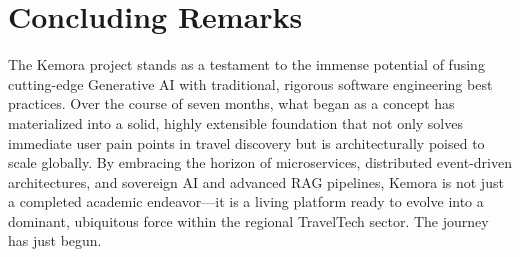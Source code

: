 \section{Concluding Remarks}
The Kemora project stands as a testament to the immense potential of fusing cutting-edge Generative AI with traditional, rigorous software engineering best practices. Over the course of seven months, what began as a concept has materialized into a solid, highly extensible foundation that not only solves immediate user pain points in travel discovery but is architecturally poised to scale globally. By embracing the horizon of microservices, distributed event-driven architectures, and sovereign AI and advanced RAG pipelines, Kemora is not just a completed academic endeavor---it is a living platform ready to evolve into a dominant, ubiquitous force within the regional TravelTech sector. The journey has just begun.
